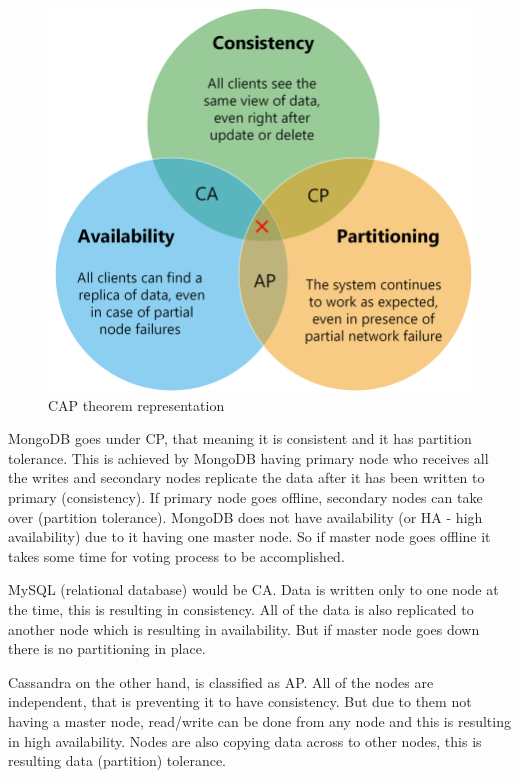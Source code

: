 \begin{figure}[H]
\includegraphics[scale=0.45]{img/CAP.jpeg}
\centering
\caption{CAP theorem representation}
\end{figure}

MongoDB goes under CP, that meaning it is consistent and it has partition tolerance. This is achieved by MongoDB having primary node who receives all the writes and secondary nodes replicate the data after it has been written to primary (consistency). If primary node goes offline, secondary nodes can take over (partition tolerance). MongoDB does not have availability (or HA - high availability) due to it having one master node. So if master node goes offline it takes some time for voting process to be accomplished.

MySQL (relational database) would be CA. Data is written only to one node at the time, this is resulting in consistency. All of the data is also replicated to another node which is resulting in availability. But if master node goes down there is no partitioning in place.

Cassandra on the other hand, is classified as AP. All of the nodes are independent, that is preventing it to have consistency. But due to them not having a master node, read/write can be done from any node and this is resulting in high availability. Nodes are also copying data across to other nodes, this is resulting data (partition) tolerance.
\parencite{web:IBMCAP}

